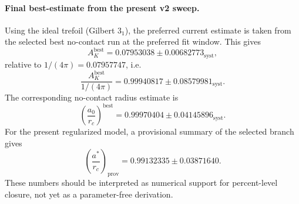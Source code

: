 \paragraph{Final best-estimate from the present v2 sweep.}
Using the ideal trefoil (Gilbert $3_1$), the preferred current estimate is taken from the selected best no-contact run at the preferred fit window. This gives\n\[
A_K^{\mathrm{best}} = 0.07953038 \pm 0.00682773_{\mathrm{syst}},
\]
relative to $1/(4\pi)=0.07957747$, i.e.\n\[
\frac{A_K^{\mathrm{best}}}{1/(4\pi)} = 0.99940817 \pm 0.08579981_{\mathrm{syst}}.
\]
The corresponding no-contact radius estimate is\n\[
\left(\frac{a_0}{r_c}\right)^{\mathrm{best}} = 0.99970404 \pm 0.04145896_{\mathrm{syst}}.
\]
For the present regularized model, a provisional summary of the selected branch gives\n\[
\left(\frac{a^*}{r_c}\right)_{\mathrm{prov}} = 0.99132335 \pm 0.03871640.
\]
These numbers should be interpreted as numerical support for percent-level closure, not yet as a parameter-free derivation.
